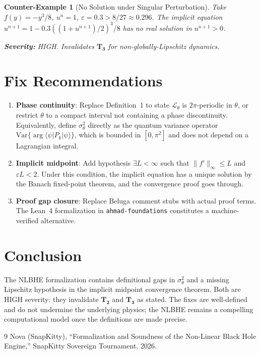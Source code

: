 \documentclass[11pt]{article}
\newtheorem{counterexample}{Counter-Example}[section]
\begin{document}
\begin{counterexample}[No Solution under Singular Perturbation]
\label{ce:sing}
Take $f(y) = -y^3/8$, $u^n = 1$, $\varepsilon = 0.3 > 8/27 \approx 0.296$.
The implicit equation $u^{n+1} = 1 - 0.3((1+u^{n+1})/2)^3/8$ has no real solution in
$u^{n+1} > 0$.

\textbf{Severity:} HIGH. Invalidates $\mathbf{T_3}$ for non-globally-Lipschitz dynamics.
\end{counterexample}

\section{Fix Recommendations}

\begin{enumerate}[label=(\arabic*)]
\item \textbf{Phase continuity}: Replace Definition~1 to state $\mathcal{L}_\theta$ is
$2\pi$-periodic in $\theta$, or restrict $\theta$ to a compact interval not containing a
phase discontinuity. Equivalently, define $\sigma^2_\theta$ directly as the quantum variance
operator $\mathrm{Var}\{\arg\langle\psi|P_k|\psi\rangle\}$, which is bounded in $[0, \pi^2]$
and does not depend on a Lagrangian integral.

\item \textbf{Implicit midpoint}: Add hypothesis $\exists L < \infty$ such that
$\|f'\|_\infty \leq L$ and $\varepsilon L < 2$. Under this condition, the implicit equation
has a unique solution by the Banach fixed-point theorem, and the convergence proof goes
through.

\item \textbf{Proof gap closure}: Replace Beluga comment stubs with actual proof terms.
The Lean~4 formalization in \texttt{ahmad-foundations} constitutes a machine-verified
alternative.
\end{enumerate}

\section{Conclusion}

The NLBHE formalization contains definitional gaps in $\sigma^2_\theta$ and a missing
Lipschitz hypothesis in the implicit midpoint convergence theorem. Both are HIGH severity:
they invalidate $\mathbf{T_2}$ and $\mathbf{T_3}$ as stated. The fixes are well-defined
and do not undermine the underlying physics; the NLBHE remains a compelling computational
model once the definitions are made precise.

\begin{thebibliography}{9}
Nova (SnapKitty),
``Formalization and Soundness of the Non-Linear Black Hole Engine,''
SnapKitty Sovereign Tournament, 2026.
\end{thebibliography}
\end{document}

